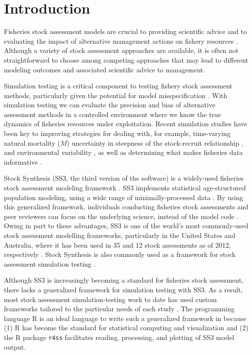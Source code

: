 \documentclass[10pt]{article}
\begin{document}
\clearpage

\section*{Introduction}

Fisheries stock assessment models are crucial to providing scientific advice and to evaluating the impact of alternative management actions on fishery resources \cite{gulland1983, hilborn1992}. Although a variety of stock assessment approaches are available, it is often not straightforward to choose among competing approaches that may lead to different modeling outcomes and associated scientific advice to management.

Simulation testing is a critical component to testing fishery stock assessment methods, particularly given the potential for model misspecification \cite{hilborn1987, hilborn1992, rosenberg1994, peterman2004, deroba2013a}. With simulation testing we can evaluate the precision and bias of alternative assessment methods in a controlled environment where we know the true dynamics of fisheries resources under exploitation. Recent simulation studies have been key to improving strategies for dealing with, for example, time-varying natural mortality ($M$) \cite{lee2011, jiao2012, deroba2013, johnson2013} uncertainty in steepness of the stock-recruit relationship \cite{lee2012}, and environmental variability \cite{schirripa2009}, as well as determining what makes fisheries data informative \cite{magnusson2007, wetzel2011a, ono2013, yin2004}.

Stock Synthesis (SS3, the third version of the software) is a widely-used fisheries stock assessment modeling framework \cite{methot2013}. SS3 implements statistical age-structured population modeling, using a wide range of minimally-processed data \cite{maunder2013, methot2013}. By using this generalized framework, individuals conducting fisheries stock assessments and peer reviewers can focus on the underlying science, instead of the model code \cite{methot2013}. Owing in part to these advantages, SS3 is one of the world's most commonly-used stock assessment modelling frameworks, particularly in the United States and Australia, where it has been used in 35 and 12 stock assessments as of 2012, respectively \cite{methot2013}. Stock Synthesis is also commonly used as a framework for stock assessment simulation testing \cite{helu2000, yin2004, schirripa2009, lee2011, jiao2012, lee2012, crone2013a, hurtadoferro2013}.

Although SS3 is increasingly becoming a standard for fisheries stock assessment, there lacks a generalized framework for simulation testing with SS3. As a result, most stock assessment simulation-testing work to date has used custom frameworks tailored to the particular needs of each study \cite{helu2000, yin2004, magnusson2007, wetzel2011a, jiao2012, wilberg2006, deroba2013a, deroba2013, crone2013a, hurtadoferro2013}. The programming language R \cite{rcoreteam2013} is an ideal language to write such a generalized framework in because (1) R has become the standard for statistical computing and visualization and (2) the R package \texttt{r4ss} \cite{r4ss2013} facilitates reading, processing, and plotting of SS3 model output.
\end{document}
